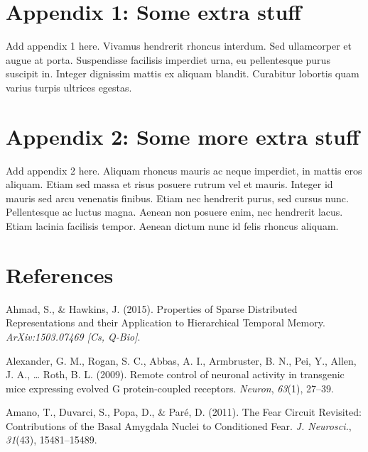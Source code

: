 \documentclass[12pt,a4paperpaper,]{report}
\begin{document}
\chapter*{Appendix 1: Some extra
stuff}\label{appendix-1-some-extra-stuff}

Add appendix 1 here. Vivamus hendrerit rhoncus interdum. Sed ullamcorper
et augue at porta. Suspendisse facilisis imperdiet urna, eu pellentesque
purus suscipit in. Integer dignissim mattis ex aliquam blandit.
Curabitur lobortis quam varius turpis ultrices egestas.

\chapter*{Appendix 2: Some more extra
stuff}\label{appendix-2-some-more-extra-stuff}

Add appendix 2 here. Aliquam rhoncus mauris ac neque imperdiet, in
mattis eros aliquam. Etiam sed massa et risus posuere rutrum vel et
mauris. Integer id mauris sed arcu venenatis finibus. Etiam nec
hendrerit purus, sed cursus nunc. Pellentesque ac luctus magna. Aenean
non posuere enim, nec hendrerit lacus. Etiam lacinia facilisis tempor.
Aenean dictum nunc id felis rhoncus aliquam.

\footnotesize

\chapter*{References}\label{references-1}

\hypertarget{refs}{}
\hypertarget{ref-ahmadux5fpropertiesux5f2015}{}
Ahmad, S., \& Hawkins, J. (2015). Properties of Sparse Distributed
Representations and their Application to Hierarchical Temporal Memory.
\emph{ArXiv:1503.07469 {[}Cs, Q-Bio{]}}.

\hypertarget{ref-alexanderux5fremoteux5f2009}{}
Alexander, G. M., Rogan, S. C., Abbas, A. I., Armbruster, B. N., Pei,
Y., Allen, J. A., \ldots{} Roth, B. L. (2009). Remote control of
neuronal activity in transgenic mice expressing evolved G
protein-coupled receptors. \emph{Neuron}, \emph{63}(1), 27--39.

\hypertarget{ref-amanoux5ffearux5f2011-1}{}
Amano, T., Duvarci, S., Popa, D., \& Paré, D. (2011). The Fear Circuit
Revisited: Contributions of the Basal Amygdala Nuclei to Conditioned
Fear. \emph{J. Neurosci.}, \emph{31}(43), 15481--15489.
\end{document}
